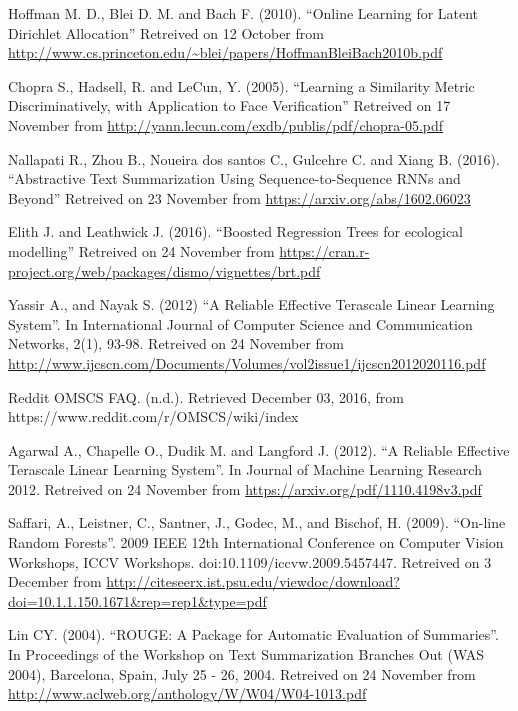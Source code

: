 \documentclass[journal]{IEEEtran}
\begin{document}
\begin{thebibliography}{1}
Hoffman M. D., Blei D. M. and Bach F. (2010). ``Online Learning for Latent Dirichlet Allocation'' Retreived on 12 October from \url{http://www.cs.princeton.edu/~blei/papers/HoffmanBleiBach2010b.pdf}

Chopra S., Hadsell, R. and LeCun, Y. (2005). ``Learning a Similarity Metric Discriminatively, with Application to Face
Verification'' Retreived on 17 November from \url{http://yann.lecun.com/exdb/publis/pdf/chopra-05.pdf}

Nallapati R., Zhou B., Noueira dos santos C., Gulcehre C. and Xiang B. (2016). ``Abstractive Text Summarization Using Sequence-to-Sequence RNNs and Beyond'' Retreived on 23 November from \url{https://arxiv.org/abs/1602.06023}

Elith J. and Leathwick J. (2016). ``Boosted Regression Trees for ecological modelling'' Retreived on 24 November from \url{https://cran.r-project.org/web/packages/dismo/vignettes/brt.pdf}


Yassir A., and Nayak S. (2012) ``A Reliable Effective Terascale Linear Learning System''. In International Journal of Computer Science and Communication Networks, 2(1), 93-98. Retreived on 24 November from \url{http://www.ijcscn.com/Documents/Volumes/vol2issue1/ijcscn2012020116.pdf}


Reddit OMSCS FAQ. (n.d.). Retrieved December 03, 2016, from https://www.reddit.com/r/OMSCS/wiki/index


Agarwal A., Chapelle O., Dudik M. and Langford J. (2012). ``A Reliable Effective Terascale Linear Learning System''. In Journal of Machine Learning Research 2012. Retreived on 24 November from \url{https://arxiv.org/pdf/1110.4198v3.pdf}

Saffari, A., Leistner, C., Santner, J., Godec, M., and Bischof, H. (2009). ``On-line Random Forests''. 2009 IEEE 12th International Conference on Computer Vision Workshops, ICCV Workshops. doi:10.1109/iccvw.2009.5457447. Retreived on 3 December from \url{http://citeseerx.ist.psu.edu/viewdoc/download?doi=10.1.1.150.1671&rep=rep1&type=pdf}


Lin CY. (2004). ``ROUGE: A Package for Automatic Evaluation of Summaries''. In Proceedings of the Workshop on Text Summarization Branches Out (WAS 2004), Barcelona, Spain, July 25 - 26, 2004. Retreived on 24 November from \url{http://www.aclweb.org/anthology/W/W04/W04-1013.pdf}

\end{thebibliography}
\end{document}
